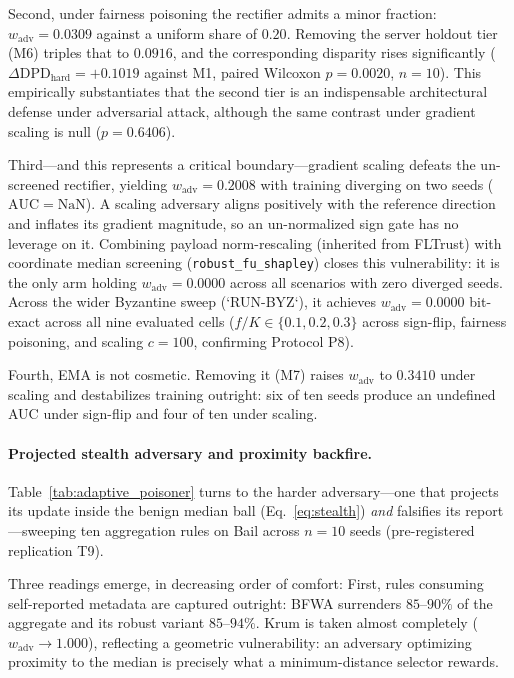 \documentclass[preprint,12pt]{elsarticle}
\theoremstyle{plain}
\theoremstyle{definition}
\theoremstyle{remark}
\newcommand{\dpd}{\mathrm{DPD}}
\begin{document}
Second, under fairness poisoning the rectifier admits a minor fraction: $w_{\mathrm{adv}} = 0.0309$ against a uniform share of $0.20$. Removing the server holdout tier (M6) triples that to $0.0916$, and the corresponding disparity rises significantly ($\Delta\dpd_{\mathrm{hard}} = +0.1019$ against M1, paired Wilcoxon $p = 0.0020$, $n = 10$). This empirically substantiates that the second tier is an indispensable architectural defense under adversarial attack, although the same contrast under gradient scaling is null ($p = 0.6406$).

Third---and this represents a critical boundary---gradient scaling defeats the un-screened rectifier, yielding $w_{\mathrm{adv}} = 0.2008$ with training diverging on two seeds ($\mathrm{AUC} = \mathrm{NaN}$). A scaling adversary aligns positively with the reference direction and inflates its gradient magnitude, so an un-normalized sign gate has no leverage on it. Combining payload norm-rescaling (inherited from FLTrust) with coordinate median screening (\texttt{robust\_fu\_shapley}) closes this vulnerability: it is the only arm holding $w_{\mathrm{adv}} = 0.0000$ across all scenarios with zero diverged seeds. Across the wider Byzantine sweep (`RUN-BYZ`), it achieves $w_{\mathrm{adv}} = 0.0000$ bit-exact across all nine evaluated cells ($f/K \in \{0.1, 0.2, 0.3\}$ across sign-flip, fairness poisoning, and scaling $c=100$, confirming Protocol P8).

Fourth, EMA is not cosmetic. Removing it (M7) raises $w_{\mathrm{adv}}$ to $0.3410$ under scaling and destabilizes training outright: six of ten seeds produce an undefined AUC under sign-flip and four of ten under scaling.

\paragraph{Projected stealth adversary and proximity backfire.}
Table~\ref{tab:adaptive_poisoner} turns to the harder adversary---one that projects its update inside the benign median ball (Eq.~\eqref{eq:stealth}) \emph{and} falsifies its report---sweeping ten aggregation rules on Bail across $n=10$ seeds (pre-registered replication T9).

Three readings emerge, in decreasing order of comfort:
First, rules consuming self-reported metadata are captured outright: BFWA surrenders $85$--$90\%$ of the aggregate and its robust variant $85$--$94\%$. Krum is taken almost completely ($w_{\mathrm{adv}} \to 1.000$), reflecting a geometric vulnerability: an adversary optimizing proximity to the median is precisely what a minimum-distance selector rewards.
\end{document}
